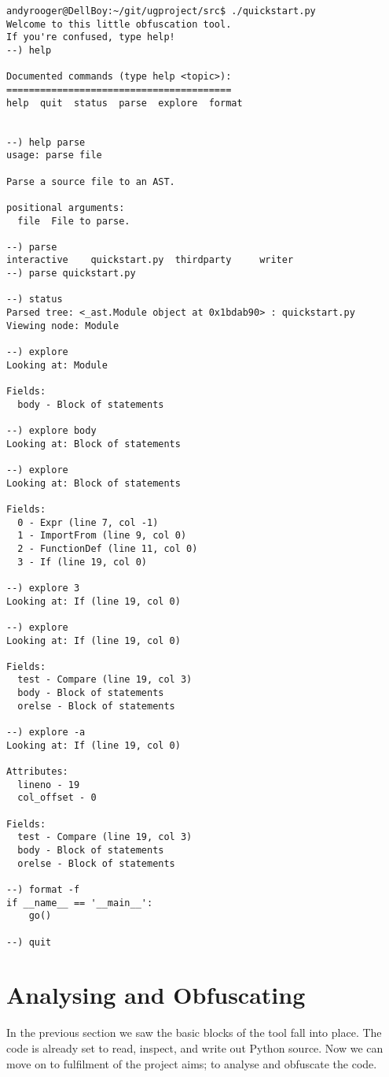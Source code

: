 \documentclass{report}
\begin{document}
\begin{lstlisting}[language=obftool,basicstyle=\small]
andyrooger@DellBoy:~/git/ugproject/src$ ./quickstart.py 
Welcome to this little obfuscation tool.
If you're confused, type help!
--) help

Documented commands (type help <topic>):
========================================
help  quit  status  parse  explore  format


--) help parse
usage: parse file

Parse a source file to an AST.

positional arguments:
  file  File to parse.

--) parse 
interactive    quickstart.py  thirdparty     writer         
--) parse quickstart.py

--) status
Parsed tree: <_ast.Module object at 0x1bdab90> : quickstart.py
Viewing node: Module

--) explore
Looking at: Module

Fields:
  body - Block of statements

--) explore body
Looking at: Block of statements

--) explore
Looking at: Block of statements

Fields:
  0 - Expr (line 7, col -1)
  1 - ImportFrom (line 9, col 0)
  2 - FunctionDef (line 11, col 0)
  3 - If (line 19, col 0)

--) explore 3
Looking at: If (line 19, col 0)

--) explore
Looking at: If (line 19, col 0)

Fields:
  test - Compare (line 19, col 3)
  body - Block of statements
  orelse - Block of statements

--) explore -a
Looking at: If (line 19, col 0)

Attributes:
  lineno - 19
  col_offset - 0

Fields:
  test - Compare (line 19, col 3)
  body - Block of statements
  orelse - Block of statements

--) format -f
if __name__ == '__main__':
    go()

--) quit
\end{lstlisting}

\section{Analysing and Obfuscating}

In the previous section we saw the basic blocks of the tool fall into place. The code
is already set to read, inspect, and write out Python source. Now we can move
on to fulfilment of the project aims; to analyse and obfuscate the code.
\end{document}
